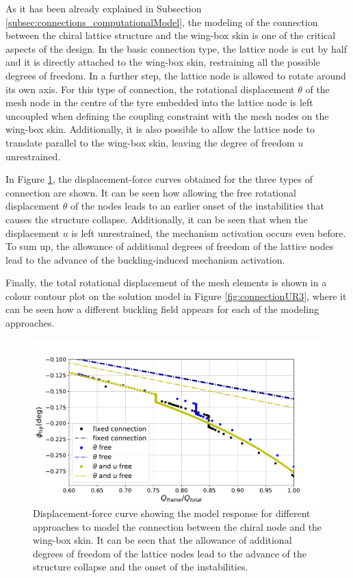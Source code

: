     As it has been already explained in Subsection \ref{subsec:connections_computationalModel}, the modeling of the connection between the chiral lattice structure and the wing-box skin is one of the critical aspects of the design. In the basic connection type, the lattice node is cut by half and it is directly attached to the wing-box skin, restraining all the possible degrees of freedom. In a further step, the lattice node is allowed to rotate around its own axis. For this type of connection,  the rotational displacement $\theta$ of the mesh node in the centre of the tyre embedded into the lattice node is left uncoupled when defining the coupling constraint with the mesh nodes on the wing-box skin. Additionally, it is also possible to allow the lattice node to translate parallel to the wing-box skin, leaving the degree of freedom $u$ unrestrained.

    In Figure \ref{fig:UR1_tau-additionalBCAll}, the displacement-force curves obtained for the three types of connection are shown. It can be seen how allowing the free rotational displacement $\theta$ of the nodes leads to an earlier onset of the instabilities that causes the structure collapse. Additionally, it can be seen that when the displacement $u$ is left unrestrained, the mechanism activation occurs even before. To sum up, the allowance of additional degrees of freedom of the lattice nodes lead to the advance of the buckling-induced mechanism activation.

    Finally, the total rotational displacement of the mesh elements is shown in a colour contour plot on the solution model in Figure \ref{fig:connectionUR3}, where it can be seen how a different buckling field appears for each of the modeling approaches. 

    \begin{figure}[!htpb]
      \centering
      \includegraphics[width=0.8 \textwidth]{figures/further/UR1_tau-additionalBCAll}
      \caption[Displacement-force curve showing the model response for different approaches to model the connection between the chiral node and the wing-box skin]{Displacement-force curve showing the model response for different approaches to model the connection between the chiral node and the wing-box skin. It can be seen that the allowance of additional degrees of freedom of the lattice nodes lead to the advance of the structure collapse and the onset of the instabilities.}
      \label{fig:UR1_tau-additionalBCAll}
    \end{figure}

